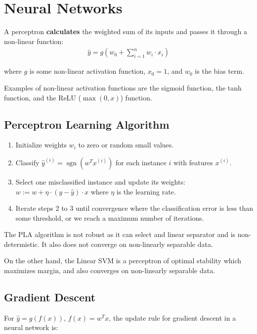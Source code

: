 \section{Neural Networks}

A perceptron \textbf{calculates} the weighted sum of its inputs and passes it through a non-linear function:\\[-0.2em]
\begin{align*}
    \hat{y} = g \left(w_0 + \sum_{i=1}^{n} w_i \cdot x_i \right)
\end{align*}

where $g$ is some non-linear activation function, $x_0 = 1$, and $w_0$ is the bias term.

Examples of non-linear activation functions are the sigmoid function, the tanh function,
and the ReLU ($\max(0, x)$) function.

\subsection{Perceptron Learning Algorithm}
\begin{enumerate}
    \item Initialize weights $w_i$ to zero or random small values.
    \item Classify $\hat{y}^{(i)} = \operatorname{sgn}(w^Tx^{(i)})$ for each instance $i$ with features $x^{(i)}$.
    \item Select one misclassified instance and update its weights: $w := w + \eta \cdot (y - \hat{y}) \cdot x$ where $\eta$ is the learning rate.
    \item Iterate steps 2 to 3 until convergence where the classification error is less than some threshold,
        or we reach a maximum number of iterations.
\end{enumerate}

The PLA algorithm is not robust as it can select and linear separator and is non-determistic.
It also does not converge on non-linearly separable data.

On the other hand, the Linear SVM is a perceptron of optimal stability which maximizes margin,
and also converges on non-linearly separable data.

\subsection{Gradient Descent}
For $\hat{y} = g(f(x))$, $f(x) = w^Tx$, the update rule for gradient descent in a neural network is:

